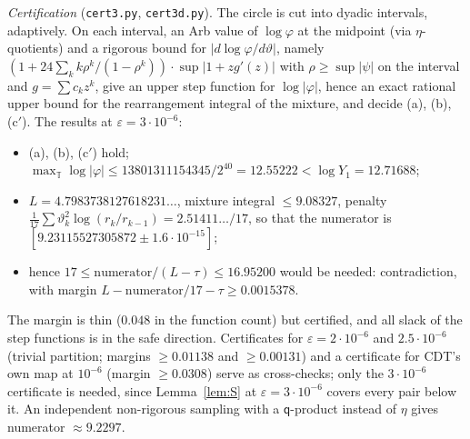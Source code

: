 \documentclass[11pt]{amsart}
\theoremstyle{definition}
\theoremstyle{remark}
\numberwithin{equation}{section}
\newcommand{\TT}{\mathbb{T}}
\newcommand{\file}[1]{{\def\_{\textunderscore\allowbreak}\texttt{#1}}}
\begin{document}
\emph{Certification} (\file{cert3.py}, \file{cert3d.py}). The circle is cut into dyadic intervals, adaptively. On each
interval, an Arb value of $\log\varphi$ at the midpoint (via $\eta$-quotients) and a rigorous bound for
$|d\log\varphi/d\vartheta|$, namely $(1+24\sum_kk\rho^k/(1-\rho^k))\cdot\sup|1+zg'(z)|$ with $\rho\ge\sup|\psi|$ on the
interval and $g=\sum c_kz^k$, give an upper step function for $\log|\varphi|$, hence an exact rational upper bound for
the rearrangement integral of the mixture, and decide (a), (b), (c$'$). The results at $\varepsilon=3\cdot10^{-6}$:
\begin{itemize}
\item (a), (b), (c$'$) hold; $\max_\TT\log|\varphi|\le13801311154345/2^{40}=12.55222<\log Y_1=12.71688$;
\item $L=4.7983738127618231\ldots$, mixture integral $\le9.08327$, penalty
$\frac1{17}\sum\vartheta_k^2\log(r_k/r_{k-1})=2.51411\ldots/17$, so that the numerator is
$[9.23115527305872\pm1.6\cdot10^{-15}]$;
\item hence $17\le\text{numerator}/(L-\tau)\le16.95200$ would be needed: contradiction, with margin
$L-\text{numerator}/17-\tau\ge0.0015378$.
\end{itemize}
The margin is thin ($0.048$ in the function count) but certified, and all slack of the step functions is in the safe
direction. Certificates for $\varepsilon=2\cdot10^{-6}$ and $2.5\cdot10^{-6}$ (trivial partition; margins $\ge0.01138$
and $\ge0.00131$) and a certificate for CDT's own map at $10^{-6}$ (margin $\ge0.0308$) serve as cross-checks; only the
$3\cdot10^{-6}$ certificate is needed, since Lemma~\ref{lem:S} at $\varepsilon=3\cdot10^{-6}$ covers every pair below it.
An independent non-rigorous sampling with a $\mathsf q$-product instead of $\eta$ gives numerator $\approx9.2297$.
\end{document}
